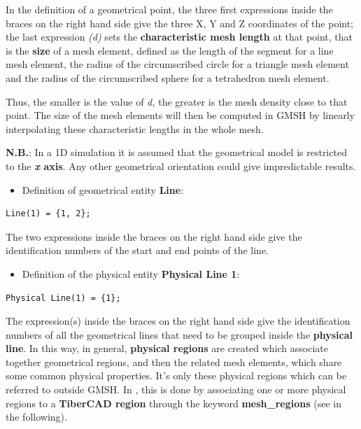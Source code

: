 In the definition of a geometrical point, the three first expressions inside the braces on the right hand side give the three X, Y and Z coordinates of the point; the last expression \textit{(d)} sets the \textbf{characteristic mesh length} at that point, that is the \textbf{size} of a mesh element, 
defined as the length of the segment for a line mesh element, the radius of the circumscribed circle for a triangle mesh element and the radius of the circumscribed sphere for a tetrahedron mesh element.


Thus, the smaller is the value of \textit{d,} the greater is the mesh density close to that point. The size of the mesh elements will then be computed in GMSH by linearly interpolating these characteristic lengths in the whole mesh.
\vspace{12pt}


\textbf{N.B.}: In a 1D simulation it is  assumed that the geometrical model is  restricted to  the  \textbf{\textit{x} axis}. Any  other geometrical orientation  could  give     impredictable results.

\begin{itemize}
	\item Definition of geometrical entity \textbf{Line}:
\end{itemize}
  
\begin{verbatim}
Line(1) = {1, 2};
\end{verbatim}
The two expressions inside the braces on the right hand side  give the identification numbers of the start and end points of the line.

\begin{itemize}
	\item Definition of the physical entity \textbf{Physical Line 1}:
\end{itemize}

\begin{verbatim}
Physical Line(1) = {1};
\end{verbatim}

The expression(s) inside the braces on the right hand side  give the identification numbers of all the geometrical lines that need to be grouped inside the \textbf{physical line}.
In this way, in general, \textbf{physical regions} are created which associate together geometrical regions, and then the related mesh elements, which share some common physical properties. It's only these physical regions which can be referred to outside GMSH. In \TiberCAD{}, this is done by associating one or more physical regions to a \textbf{TiberCAD{} region }through the keyword \textbf{mesh\_regions} (see in the following).

